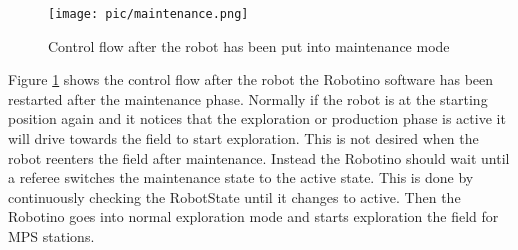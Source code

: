 \begin{figure}[h]
\centering
\texttt{[image: pic/maintenance.png]}
\caption{Control flow after the robot has been put into maintenance mode}
\label{fig:maintenance}
\end{figure}


Figure \ref{fig:maintenance} shows the control flow after the robot the Robotino software has been restarted after the maintenance phase. Normally if the robot is at the starting position again and it notices that the exploration or production phase is active it will drive towards the field to start exploration. This is not desired when the robot reenters the field after maintenance. Instead the Robotino should wait until a referee switches the maintenance state to the active state. This is done by continuously checking the RobotState until it changes to active. Then the Robotino goes into normal exploration mode and starts exploration the field for MPS stations. \\


